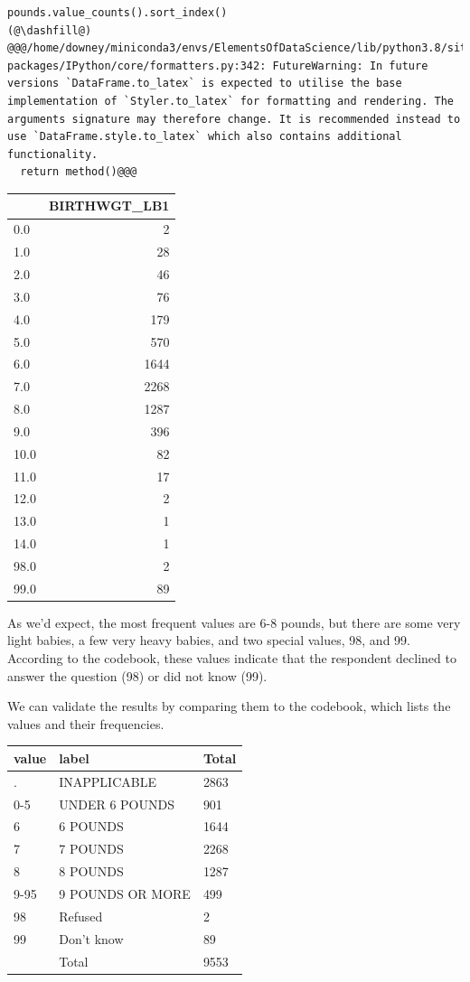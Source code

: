 \begin{lstlisting}[]
pounds.value_counts().sort_index()
(@\dashfill@)
@@@/home/downey/miniconda3/envs/ElementsOfDataScience/lib/python3.8/site-packages/IPython/core/formatters.py:342: FutureWarning: In future versions `DataFrame.to_latex` is expected to utilise the base implementation of `Styler.to_latex` for formatting and rendering. The arguments signature may therefore change. It is recommended instead to use `DataFrame.style.to_latex` which also contains additional functionality.
  return method()@@@
\end{lstlisting}

\begin{tabular}{lr}
\midrule
{} &  BIRTHWGT\_LB1 \\
\midrule
0.0  &             2 \\
1.0  &            28 \\
2.0  &            46 \\
3.0  &            76 \\
4.0  &           179 \\
5.0  &           570 \\
6.0  &          1644 \\
7.0  &          2268 \\
8.0  &          1287 \\
9.0  &           396 \\
10.0 &            82 \\
11.0 &            17 \\
12.0 &             2 \\
13.0 &             1 \\
14.0 &             1 \\
98.0 &             2 \\
99.0 &            89 \\
\midrule
\end{tabular}

As we'd expect, the most frequent values are 6-8 pounds, but there are
some very light babies, a few very heavy babies, and two special values,
98, and 99. According to the codebook, these values indicate that the
respondent declined to answer the question (98) or did not know (99).

We can validate the results by comparing them to the codebook, which
lists the values and their frequencies.

\begin{longtable}[]{@{}lll@{}}
\midrule()
value & label & Total \\
\midrule()
\endhead
. & INAPPLICABLE & 2863 \\
0-5 & UNDER 6 POUNDS & 901 \\
6 & 6 POUNDS & 1644 \\
7 & 7 POUNDS & 2268 \\
8 & 8 POUNDS & 1287 \\
9-95 & 9 POUNDS OR MORE & 499 \\
98 & Refused & 2 \\
99 & Don't know & 89 \\
& Total & 9553 \\
\midrule()
\end{longtable}

